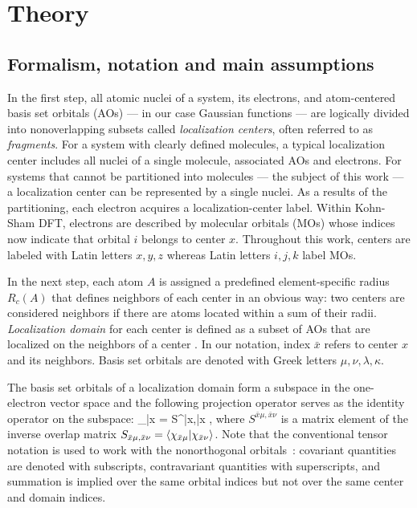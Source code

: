\documentclass[10pt,amsmath,twocolumn,aps,prl,superscriptaddress,floatfix]{revtex4-1}
\begin{document}
\section{Theory} 

\subsection{Formalism, notation and main assumptions}
 
In the first step, all atomic nuclei of a system, its electrons, and atom-centered basis set orbitals (AOs) --- in our case Gaussian functions --- are logically divided into nonoverlapping subsets called \emph{localization centers}, often referred to as \emph{fragments}. 
For a system with clearly defined molecules, a typical localization center includes all nuclei of a single molecule, associated AOs and electrons. 
For systems that cannot be partitioned into molecules --- the subject of this work --- a localization center can be represented by a single nuclei. 
As a results of the partitioning, each electron acquires a localization-center label. 
Within Kohn-Sham DFT, electrons are described by molecular orbitals (MOs)  whose indices now indicate that orbital $i$ belongs to center $x$. Throughout this work, centers are labeled with Latin letters $x,y,z$ whereas Latin letters $i,j,k$ label MOs. 

In the next step, each atom $A$ is assigned a predefined element-specific radius $R_c(A)$ that defines neighbors of each center in an obvious way: two centers are considered neighbors if there are atoms located within a sum of their radii. 
\emph{Localization domain} for each center is defined as a subset of AOs that are localized on the neighbors of a center . In our notation, index $\bar{x}$ refers to center $x$ and its neighbors. Basis set orbitals are denoted with Greek letters $\mu,\nu,\lambda, \kappa$. 

The basis set orbitals of a localization domain form a subspace in the one-electron vector space and the following projection operator serves as the identity operator on the subspace:
%
\bea
{}_{\bar{x}} =  S^{\bar{x}\mu,\bar{x}\nu} ,
\eea
%
where $S^{\bar{x}\mu,\bar{x}\nu}$ is a matrix element of the inverse overlap matrix $S_{\bar{x}\mu,\bar{x}\nu} = \langle  \chi_{\bar{x}\mu} \vert  \chi_{\bar{x}\nu} \rangle $. Note that the conventional tensor notation is used to work with the nonorthogonal orbitals~\cite{head1998tensor}: covariant quantities are denoted with subscripts, contravariant quantities with superscripts, and summation is implied over the same orbital indices but not over the same center and domain indices. 
\end{document}

